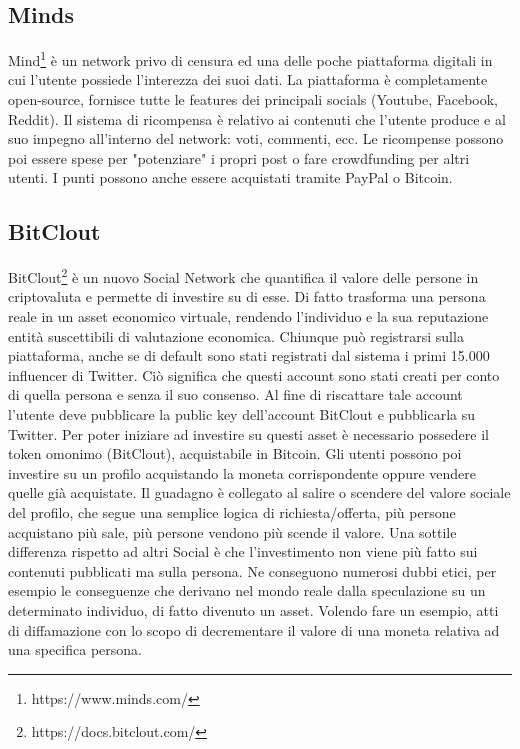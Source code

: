 \subsection{Minds}
Mind\footnote{https://www.minds.com/} è un network privo di censura ed una delle poche piattaforma digitali in cui l'utente possiede l'interezza dei suoi dati. La piattaforma è completamente open-source, fornisce tutte le features dei principali socials (Youtube, Facebook, Reddit). Il sistema di ricompensa è relativo ai contenuti che l'utente produce e al suo impegno all'interno del network: voti, commenti, ecc. Le ricompense possono poi essere spese per "potenziare" i propri post o fare crowdfunding per altri utenti. I punti possono anche essere acquistati tramite PayPal o Bitcoin.

\subsection{BitClout}
BitClout\footnote{https://docs.bitclout.com/} è un nuovo Social Network che quantifica il valore delle persone in criptovaluta e permette di investire su di esse. Di fatto trasforma una persona reale in un asset economico virtuale, rendendo l'individuo e la sua reputazione entità suscettibili di valutazione economica. Chiunque può registrarsi sulla piattaforma, anche se di default sono stati registrati dal sistema i primi 15.000 influencer di Twitter. Ciò significa che questi account sono stati creati per conto di quella persona e senza il suo consenso. Al fine di riscattare tale account l'utente deve pubblicare la public key dell'account BitClout e pubblicarla su Twitter. 
Per poter iniziare ad investire su questi asset è necessario possedere il token omonimo (BitClout), acquistabile in Bitcoin. Gli utenti possono poi investire su un profilo acquistando la moneta corrispondente oppure vendere quelle già acquistate. Il guadagno è collegato al salire o scendere del valore sociale del profilo, che segue una semplice logica di richiesta/offerta, più persone acquistano più sale, più persone vendono più scende il valore.
Una sottile differenza rispetto ad altri Social è che l'investimento non viene più fatto sui contenuti pubblicati ma sulla persona. Ne conseguono numerosi dubbi etici, per esempio le conseguenze che derivano nel mondo reale dalla speculazione su un determinato individuo, di fatto divenuto un asset. Volendo fare un esempio, atti di diffamazione con lo scopo di decrementare il valore di una moneta relativa ad una specifica persona.



